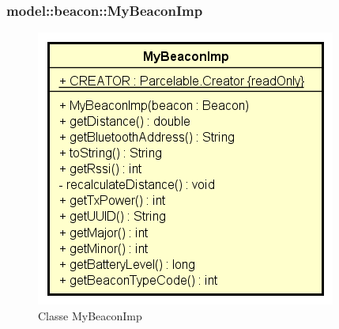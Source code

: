 \documentclass[../DefinizioneDiProdotto.tex]{subfiles}
\begin{document}
\subsubsection{model::beacon::MyBeaconImp}

    \begin{figure}[H]
        \centering
        \includegraphics{img/MyBeaconImp.png}
        \caption{Classe MyBeaconImp}\label{fig:model::beacon::MyBeaconImp} 
    \end{figure}
\end{document}
